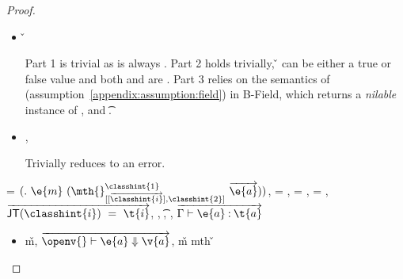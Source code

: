 \begin{lemma}
\begin{proof}
\begin{case}[T-FieldStatic]
\begin{itemize}
  \item[]
\begin{subcase}[B-Field]
  \opsem {\openv{}}
         {} 
         { {\classfieldpair{\fld{}} {\v{}}}}


Part 1 is trivial as \object{} is always \emptyobject{}.
Part 2 holds trivially, \v{} can be either a true or false value
and both {\thenprop{\prop{}}} and {\elseprop{\prop{}}}
are \topprop{}.
Part 3 relies on the semantics of \getfieldliteral (assumption~\ref{appendix:assumption:field})
in B-Field, which returns a \emph{nilable} instance of ,
and  {\t{}}.
\end{subcase}
  \item[]
\begin{subcase}[BE-Field]
  \opsem {\openv{}}
         {} 
         {\errorvalv{}},
  \opsem {\openv{}}
         {\e{}}
         {\errorvalv{}}

         Trivially reduces to an error.

\end{subcase}

\end{itemize}
\end{case}

\begin{case}[T-MethodStatic]
  \e{} = ${\methodstaticexp {\classhint{1}} 
                          {\overrightarrow {\classhint{i}}} 
                          {\classhint{2}}
                          {\mth{}} {\e{m}} {\overrightarrow{\e{a}}}}$,
  \thenprop{\prop{}} = \topprop{}, \elseprop{\prop{}} = \topprop{}, \object{} = \emptyobject{},
  $\overrightarrow{\javatotc {\classhint{i}} {\t{i}}}$,
              {\class{}},
              {\t{}},
  \judgementtwo {\propenv{}} {} {\class{}},
             $\overrightarrow{
  \judgementtwo {\propenv{}} {\e{a}} {\t{a}}
                  }$

\begin{itemize}
  \item[]
\begin{subcase}[B-Method]
  \opsem {\openv{}}
         {}
         {\v{m}},
  $\overrightarrow{
  \opsem {\openv{}}
         {\e{a}}
         {\v{a}}}$,
   {\v{m}} {mth}
                    {} {}
                    {}
                    {\v{}}



\end{subcase}
\end{itemize}
\end{case}
\end{proof}
\end{lemma}
